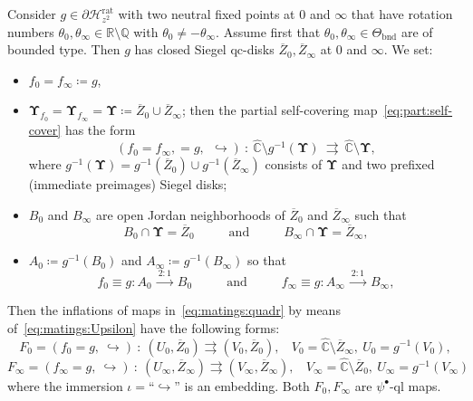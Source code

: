 \documentclass{amsart}
\renewcommand{\sp}{{\ \ }}
\newcommand{\1}{{\mathbb 1 }}
\newcommand{\bUpsilon}{{\mathbf \Upsilon}}
\newcommand{\wC}{\widehat{\mathbb{C}}}
\newcommand{\Q}{\mathbb{Q}}
\newcommand{\R}{\mathbb{R}}
\theoremstyle{remark}
\numberwithin{equation}{section}
\theoremstyle{definition}
\newcommand{\bnd}{{\mathrm{bnd}}}
\begin{document}
Consider $g\in \partial \mathcal H^\text{rat}_{z^2}$ with two neutral fixed points at $0$ and $\infty$ that have rotation numbers $\theta_0,\theta_\infty\in \R\setminus \Q$ with $\theta_0\not= -\theta_\infty$. Assume first that  $\theta_0,\theta_\infty\in \Theta_\bnd$ are of bounded type. Then $g$ has closed Siegel qc-disks $\overline Z_0, \overline Z_\infty$ at $0$ and $\infty$. We set:
\begin{itemize}
\item $f_0=f_\infty\coloneqq g$,
\item $\bUpsilon_{f_0}=\bUpsilon_{f_\infty}=\bUpsilon\coloneqq \overline Z_0 \cup \overline Z_\infty$; then the partial self-covering map~\eqref{eq:part:self-cover} has the form
\begin{equation}
\label{eq:matings:Upsilon} (f_0=f_\infty,=g, \ \ \hookrightarrow)\ \colon\ \wC\setminus g^{-1}(\bUpsilon) \ \rightrightarrows\ \wC\setminus \bUpsilon,
\end{equation}
where $g^{-1}(\bUpsilon) = g^{-1}(\overline Z_0) \cup g^{-1}(\overline Z_\infty)$ consists of $\bUpsilon$ and two prefixed (immediate preimages) Siegel disks;
\item $B_0$ and $B_\infty$ are open Jordan neighborhoods of $\overline Z_0$ and $\overline Z_\infty$ such that
\[B_0\cap  \bUpsilon =\overline Z_0 \hspace{1cm}\text{ and } \hspace{1cm} B_\infty\cap  \bUpsilon =\overline Z_\infty,\]
\item $A_0\coloneqq g^{-1}(B_0)$ and $A_\infty\coloneqq g^{-1}(B_\infty)$ so that 
\begin{equation}
\label{eq:matings:quadr} f_0\equiv g \colon A_0\ \overset{2:1}{\longrightarrow} \ B_0 \hspace{1cm}\text{ and } \hspace{1cm}    f_\infty\equiv g \colon A_\infty\ \overset{2:1}{\longrightarrow} \ B_\infty,
\end{equation}
\end{itemize}


Then the inflations of maps in~\eqref{eq:matings:quadr} by means of~\eqref{eq:matings:Upsilon} have the following forms:
\[F_0= (f_0=g,\ \hookrightarrow )\  \colon\  (U_0, \overline Z_0)\rightrightarrows (V_0,  \overline Z_0), \sp\sp V_0=\wC \setminus \overline Z_\infty, \ U_0=g^{-1}(V_0),\]
\[F_\infty= (f_\infty=g, \ \hookrightarrow )\  \colon\  (U_\infty, \overline Z_\infty)\rightrightarrows (V_\infty,  \overline Z_\infty), \sp\sp V_\infty=\wC \setminus \overline Z_0, \ U_\infty=g^{-1}(V_\infty)\]
where the immersion $\iota=$``$\hookrightarrow$'' is an embedding. Both $F_0, F_\infty$ are $\psi^\bullet$-ql maps.
\end{document}
